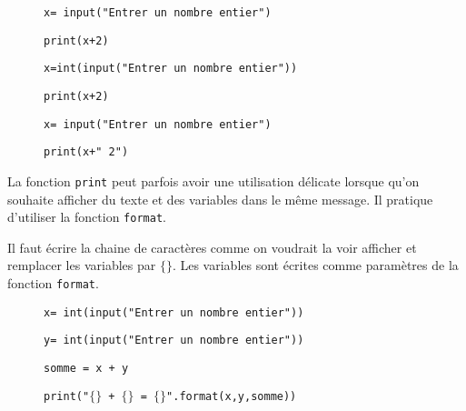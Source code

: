 \begin{minipage}{0.3\linewidth}

\begin{Cod}
\begin{description}
\item[] \texttt{x= input("Entrer un nombre entier") }
\item[] \texttt{print(x+2)}
\end{description}
\end{Cod}
\end{minipage}
\begin{minipage}{0.3\linewidth}
 
\begin{Cod}
\begin{description}
\item[] \texttt{x=int(input("Entrer un nombre entier"))}
\item[] \texttt{print(x+2)}
\end{description}
\end{Cod}
\end{minipage}
\begin{minipage}{0.3\linewidth}
 
\begin{Cod}
\begin{description}
\item[] \texttt{x= input("Entrer un nombre entier") }
\item[] \texttt{print(x+" 2")}
\end{description}
\end{Cod}
\end{minipage}
 

\begin{Rq}
La fonction \texttt{print} peut parfois avoir une utilisation délicate lorsque qu'on souhaite afficher du texte et des variables dans le même message. Il pratique d'utiliser la fonction \texttt{format}.
\end{Rq}

\begin{Ex}

Il faut écrire la chaine de caractères comme on voudrait la voir afficher et remplacer les variables par \texttt{$\lbrace\rbrace$}. Les variables sont écrites comme paramètres de la fonction \texttt{format}.
\begin{description}
\item[] \texttt{x= int(input("Entrer un nombre entier")) }
\item[] \texttt{y= int(input("Entrer un nombre entier")) }
\item[] \texttt{somme = x + y }
\item[] \texttt{print("$\lbrace\rbrace$ + $\lbrace\rbrace$ = $\lbrace\rbrace$".format(x,y,somme))}
\end{description}
\end{Ex}

